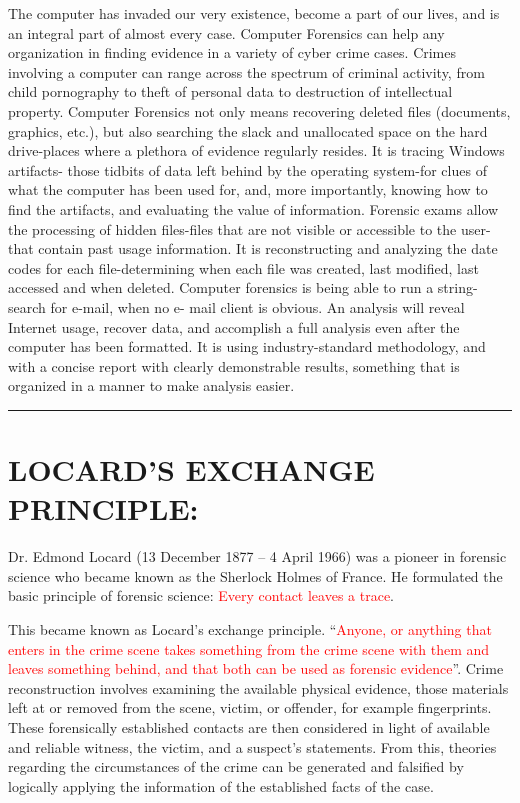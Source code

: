 \documentclass[10pt,british,english]{article}
\begin{document}
The computer has invaded our very existence, become a part of our
lives, and is an integral part of almost every case. Computer Forensics
can help any organization in finding evidence in a variety of cyber
crime cases. Crimes involving a computer can range across the spectrum
of criminal activity, from child pornography to theft of personal
data to destruction of intellectual property. Computer Forensics not
only means recovering deleted files (documents, graphics, etc.), but
also searching the slack and unallocated space on the hard drive-places
where a plethora of evidence regularly resides. It is tracing Windows
artifacts- those tidbits of data left behind by the operating system-for
clues of what the computer has been used for, and, more importantly,
knowing how to find the artifacts, and evaluating the value of information.
Forensic exams allow the processing of hidden files-files that are
not visible or accessible to the user-that contain past usage information.
It is reconstructing and analyzing the date codes for each file-determining
when each file was created, last modified, last accessed and when
deleted. Computer forensics is being able to run a string-search for
e-mail, when no e- mail client is obvious. An analysis will reveal
Internet usage, recover data, and accomplish a full analysis even
after the computer has been formatted. It is using industry-standard
methodology, and with a concise report with clearly demonstrable results,
something that is organized in a manner to make analysis easier.

\rule[0.5ex]{1\columnwidth}{1pt}

\section{LOCARD\textquoteright S EXCHANGE PRINCIPLE:}

Dr. Edmond Locard (13 December 1877 -- 4 April 1966) was a pioneer
in forensic science who became known as the \textquotedbl Sherlock
Holmes of France\textquotedbl . He formulated the basic principle
of forensic science: \textquotedbl\textcolor{red}{Every contact
leaves a trace}\textquotedbl . 

This became known as Locard's exchange principle. \textquotedblleft \textcolor{red}{Anyone,
or anything that enters in the crime scene takes something from the
crime scene with them and leaves something behind, and that both can
be used as forensic evidence}\textquotedblright . Crime reconstruction
involves examining the available physical evidence, those materials
left at or removed from the scene, victim, or offender, for example
fingerprints. These forensically established contacts are then considered
in light of available and reliable witness, the victim, and a suspect's
statements. From this, theories regarding the circumstances of the
crime can be generated and falsified by logically applying the information
of the established facts of the case.
\end{document}
